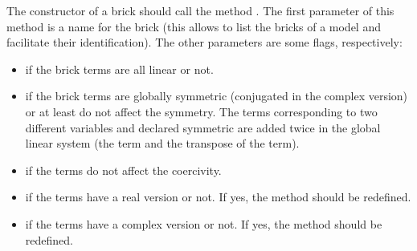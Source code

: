 \documentclass[a4paper,11pt,english]{sphinxmanual}
\begin{document}
\begin{sphinxVerbatim}[commandchars=\\\{\}]
        \PYG{p}{[}\PYG{p}{]}
        \PYG{p}{[}\PYG{p}{]}

    \PYG{p}{[}\PYG{p}{]}
    \PYG{p}{[}\PYG{p}{]}   

     
                                     
                                     
                                     
                                     
\end{sphinxVerbatim}

The constructor of a brick should call the method . The first
parameter of this method is a name for the brick (this allows to list the bricks
of a model and facilitate their identification). The other parameters are some
flags, respectively:
\begin{itemize}
\item {} 
if the brick terms are all linear or not.

\item {} 
if the brick terms are globally symmetric (conjugated in the complex version) or
at least do not affect the symmetry. The terms corresponding to two different
variables and declared symmetric are added twice in the global linear system
(the term and the transpose of the term).

\item {} 
if the terms do not affect the coercivity.

\item {} 
if the terms have a real version or not. If yes, the method
 should be redefined.

\item {} 
if the terms have a complex version or not. If yes, the method
 should be redefined.

\end{itemize}
\end{document}

